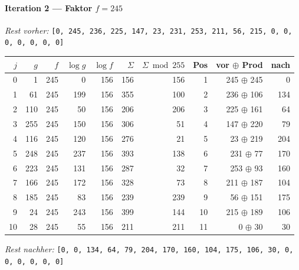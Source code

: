 \paragraph{Iteration 2 — Faktor $f = 245$}
\textit{Rest vorher:} \texttt{[0, 245, 236, 225, 147, 23, 231, 253, 211, 56, 215, 0, 0, 0, 0, 0, 0, 0]}\par
\begin{center}
\footnotesize
\setlength{\tabcolsep}{4pt}
\renewcommand{\arraystretch}{1.1}
\begin{tabular}{r|rr|rrrr|rrr}
\toprule
$j$ & $g$ & $f$ & $\log g$ & $\log f$ & $\Sigma$ & $\Sigma\bmod 255$ & Pos & vor $\oplus$ Prod & nach \\
\midrule
0 & 1 & 245 & 0 & 156 & 156 & 156 & 1 & 245 $\oplus$ 245 & 0 \\
1 & 61 & 245 & 199 & 156 & 355 & 100 & 2 & 236 $\oplus$ 106 & 134 \\
2 & 110 & 245 & 50 & 156 & 206 & 206 & 3 & 225 $\oplus$ 161 & 64 \\
3 & 255 & 245 & 150 & 156 & 306 & 51 & 4 & 147 $\oplus$ 220 & 79 \\
4 & 116 & 245 & 120 & 156 & 276 & 21 & 5 & 23 $\oplus$ 219 & 204 \\
5 & 248 & 245 & 237 & 156 & 393 & 138 & 6 & 231 $\oplus$ 77 & 170 \\
6 & 223 & 245 & 131 & 156 & 287 & 32 & 7 & 253 $\oplus$ 93 & 160 \\
7 & 166 & 245 & 172 & 156 & 328 & 73 & 8 & 211 $\oplus$ 187 & 104 \\
8 & 185 & 245 & 83 & 156 & 239 & 239 & 9 & 56 $\oplus$ 151 & 175 \\
9 & 24 & 245 & 243 & 156 & 399 & 144 & 10 & 215 $\oplus$ 189 & 106 \\
10 & 28 & 245 & 55 & 156 & 211 & 211 & 11 & 0 $\oplus$ 30 & 30 \\
\bottomrule
\end{tabular}
\end{center}
\textit{Rest nachher:} \texttt{[0, 0, 134, 64, 79, 204, 170, 160, 104, 175, 106, 30, 0, 0, 0, 0, 0, 0]}\par\medskip
